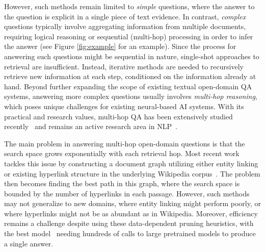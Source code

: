 However, such methods remain limited to \emph{simple} questions, where the answer to the question is explicit in a single piece of text evidence. In contrast, \emph{complex} questions typically involve aggregating information from multiple documents, requiring logical reasoning or sequential (multi-hop) processing in order to infer the answer (see Figure \ref{fig:example} for an example). %
Since the process for answering such questions might be sequential in nature, single-shot approaches to retrieval are insufficient. Instead, iterative methods are needed to recursively retrieve new information at each step, conditioned on the information already at hand.
Beyond further expanding the scope of existing textual open-domain QA systems, answering more complex questions usually involves \textit{multi-hop reasoning}, which poses unique challenges for existing neural-based AI systems. With its practical and research values,
multi-hop QA has been extensively studied recently~\citep{ComplexWebQ,HotpotQA,Wikihop} and remains an active research area in NLP~\citep{GoldEn,SMR,DecomQA,Transformer-XH,GraphRecurrentRetriever,UQD}.

The main problem in answering multi-hop open-domain questions is that the search space grows exponentially with each retrieval hop. Most recent work tackles this issue by constructing a document graph utilizing either entity linking or existing hyperlink structure in the underlying Wikipedia corpus~\citep{SMR,GraphRecurrentRetriever}. The problem then becomes finding the best path in this graph, where the search space is bounded by the number of hyperlinks in each passage. However, such methods may not generalize to new domains, where entity linking might perform poorly, or where hyperlinks might not be as abundant as in Wikipedia. Moreover, efficiency remains a challenge despite using these data-dependent pruning heuristics, with the best model~\citep{GraphRecurrentRetriever} needing hundreds of calls to large pretrained models to produce a single answer.  

